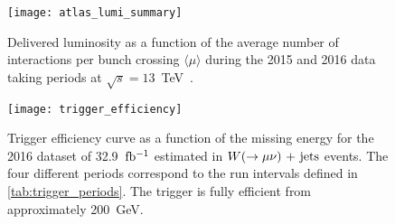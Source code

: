 \begin{figure}[!ht]
  \centering
    \texttt{[image: atlas\_lumi\_summary]}
    \caption{Delivered luminosity as a function of the average number of
      interactions per bunch crossing $\langle \mu \rangle$ during the 2015 and
      2016 data taking periods at $\sqrt{s} = 13$~TeV~\cite{LumiSummaryPlots}.}
    \label{fig:lumi_summary}
\end{figure}
\begin{figure}[!ht]
  \centering
    \texttt{[image: trigger\_efficiency]}
    \caption{Trigger efficiency curve as a function of the missing energy for
      the 2016 dataset of 32.9~$\mbox{fb$^{-1}$}$ estimated in $W (\rightarrow \mu \nu)\mathrm{~+~jets}$ events. The
      four different periods correspond to the run intervals defined in
      \cref{tab:trigger_periods}. The trigger is fully efficient from
      approximately 200~GeV.}
    \label{fig:trigger_efficiency}
\end{figure}
